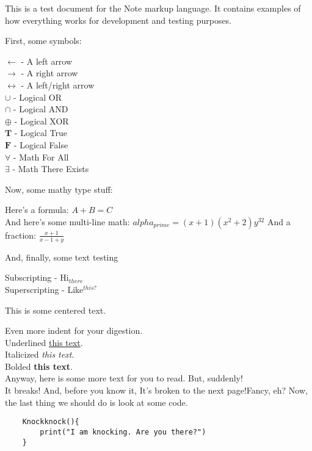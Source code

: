 \documentclass[12pt]{article}
\begin{document}
This is a test document for the Note markup language. It contains examples of how everything works for development and testing purposes.

First, some symbols:
\begin{adjustwidth}{4em}{0em}
    $\leftarrow$ - A left arrow \\
    $\rightarrow$ - A right arrow \\
    $\leftrightarrow$ - A left/right arrow \\
    $\cup$ - Logical OR \\
    $\cap$ - Logical AND \\
    $\oplus$ - Logical XOR \\
    $\mathbf{T}$ - Logical True \\
    $\mathbf{F}$ - Logical False \\
    $\forall$ - Math For All \\
    $\exists$ - Math There Exists \\
\end{adjustwidth}

Now, some mathy type stuff:
\begin{adjustwidth}{4em}{0em}
    Here's a formula: $ A+B=C $ \\
    And here's some multi-line math:
    $
        alpha_{prime} = (x+1)(x^2+2)y^{32}
    $
    And a fraction: $\frac{x+1}{x-1+y}$  \\
\end{adjustwidth}

And, finally, some text testing
\begin{adjustwidth}{4em}{0em}
    Subscripting - Hi$_{there}$ \\
    Superscripting - Like$^{this?}$ \\
    \begin{center}
    This is some centered text. \\
    \end{center}
    \hspace{4em} Even more indent for your digestion. \\
    Underlined \underline{this text}.\\
    Italicized \textit{this text}.\\
    Bolded \textbf{this text}.\\
    Anyway, here is some more text for you to read. But, suddenly! \\ It breaks! And, before you know it, 
    \clearpage
    It's broken to the next page!Fancy,  eh?
    Now, the last thing we should do is look at some code.
    \begin{verbatim}
    Knockknock(){
        print("I am knocking. Are you there?")
    }
    \end{verbatim}
\end{adjustwidth}
\end{document}
